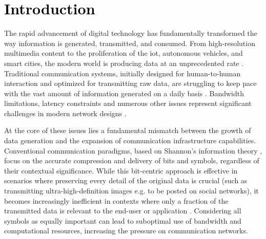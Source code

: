 \chapter{\textcolor{black}{Introduction}}
\thispagestyle{plain}
The rapid advancement of digital technology has fundamentally transformed the way information is generated, transmitted, and consumed. From high-resolution multimedia content to the proliferation of the \gls{iot}, autonomous vehicles, and smart cities, the modern world is producing data at an unprecedented rate \cite{Aliyu2017Towards, Balaji2023Machine}. Traditional communication systems, initially designed for human-to-human interaction and optimized for transmitting raw data, are struggling to keep pace with the vast amount of information generated on a daily basis \cite{Jaafreh2018Multimodal, Mordacchini2020HumanCentric}. Bandwidth limitations, latency constraints and numerous other issues represent significant challenges in modern network designs \cite{Tassi2017Modeling}.

At the core of these issues lies a fundamental mismatch between the growth of data generation and the expansion of communication infrastructure capabilities. Conventional communication paradigms, based on Shannon's information theory \cite{Shannon1948Communication}, focus on the accurate compression and delivery of bits and symbols, regardless of their contextual significance. While this bit-centric approach is effective in scenarios where preserving every detail of the original data is crucial (such as transmitting ultra-high-definition images e.g. to be posted on social networks), it becomes increasingly inefficient in contexts where only a fraction of the transmitted data is relevant to the end-user or application \cite{Strinati20216G, Gunduz20246G}. Considering all symbols as equally important can lead to suboptimal use of bandwidth and computational resources, increasing the pressure on communication networks.


